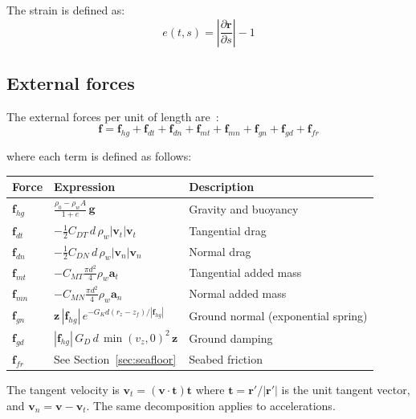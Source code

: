 \documentclass[11pt]{article}
\newcommand{\pa}{\partial}
\begin{document}
The strain is defined as:
\begin{equation}
e(t,s) = \left|\frac{\pa\mathbf{r}}{\pa s}\right| - 1
\end{equation}

\subsection{External forces}

The external forces per unit of length are~\cite{Aamo-2000,Desire-2022}:
\begin{equation}
\mathbf{f} = \mathbf{f}_{hg} + \mathbf{f}_{dt} + \mathbf{f}_{dn} + \mathbf{f}_{mt} + \mathbf{f}_{mn} + \mathbf{f}_{gn} + \mathbf{f}_{gd} + \mathbf{f}_{fr}
\end{equation}

where each term is defined as follows:

\begin{center}
\begin{tabular}{lll}
\toprule
\textbf{Force} & \textbf{Expression} & \textbf{Description} \\
\midrule
$\mathbf{f}_{hg}$ & $\displaystyle\frac{\rho_0-\rho_w A}{1+e}\,\mathbf{g}$ & Gravity and buoyancy \\[8pt]
$\mathbf{f}_{dt}$ & $\displaystyle-\tfrac{1}{2}C_{DT}\,d\,\rho_w|\mathbf{v}_t|\mathbf{v}_t$ & Tangential drag \\[8pt]
$\mathbf{f}_{dn}$ & $\displaystyle-\tfrac{1}{2}C_{DN}\,d\,\rho_w|\mathbf{v}_n|\mathbf{v}_n$ & Normal drag \\[8pt]
$\mathbf{f}_{mt}$ & $\displaystyle-C_{MT}\tfrac{\pi d^2}{4}\rho_w\mathbf{a}_t$ & Tangential added mass \\[8pt]
$\mathbf{f}_{mn}$ & $\displaystyle-C_{MN}\tfrac{\pi d^2}{4}\rho_w\mathbf{a}_n$ & Normal added mass \\[8pt]
$\mathbf{f}_{gn}$ & $\displaystyle\mathbf{z}\,|\mathbf{f}_{hg}|\,e^{-G_K d(r_z - z_f)/|\mathbf{f}_{hg}|}$ & Ground normal (exponential spring) \\[8pt]
$\mathbf{f}_{gd}$ & $\displaystyle|\mathbf{f}_{hg}|\,G_D\,d\,\min(v_z,0)^2\,\mathbf{z}$ & Ground damping \\[8pt]
$\mathbf{f}_{fr}$ & See Section~\ref{sec:seafloor} & Seabed friction \\
\bottomrule
\end{tabular}
\end{center}

The tangent velocity is $\mathbf{v}_t = (\mathbf{v}\cdot\mathbf{t})\mathbf{t}$ where $\mathbf{t}=\mathbf{r}'/|\mathbf{r}'|$ is the unit tangent vector, and $\mathbf{v}_n = \mathbf{v}-\mathbf{v}_t$. The same decomposition applies to accelerations.
\end{document}
